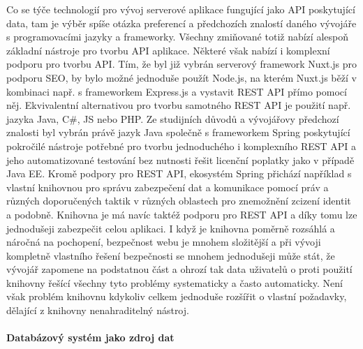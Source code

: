 \begin{itemize}
\begin{itemize}
			Co se týče technologií pro vývoj serverové aplikace fungující jako \ac{API} poskytující data, tam je výběr spíše
			otázka preferencí a předchozích znalostí daného vývojáře s programovacími jazyky a frameworky.
			Všechny zmiňované totiž nabízí alespoň základní nástroje pro tvorbu \ac{API} aplikace.
			Některé však nabízí i komplexní podporu pro tvorbu \ac{API}.
			Tím, že byl již vybrán serverový framework Nuxt.js pro podporu \Ac{SEO}, by bylo možné jednoduše použít Node.js,
			na kterém Nuxt.js běží v kombinaci např. s frameworkem Express.js a vystavit \Ac{REST} \ac{API} přímo pomocí něj.
			Ekvivalentní alternativou pro tvorbu samotného \Ac{REST} \ac{API} je použití např. jazyka Java, C\#, \ac{JS}
			nebo \Ac{PHP}.
			Ze studijních důvodů a vývojářovy předchozí znalosti byl vybrán právě jazyk Java společně s frameworkem
			Spring poskytující pokročilé nástroje potřebné pro tvorbu jednoduchého i komplexního \Ac{REST} \ac{API} a jeho
			automatizované testování bez nutnosti řešit licenční poplatky jako v případě Java EE.
			Kromě podpory pro \ac{REST} \ac{API}, ekosystém Spring přichází například s vlastní knihovnou pro správu
			zabezpečení dat a komunikace pomocí práv a různých doporučených taktik v různých oblastech pro znemožnění zcizení
			identit a podobně.
			Knihovna je má navíc taktéž podporu pro \ac{REST} \ac{API} a díky tomu lze jednodušeji zabezpečit celou aplikaci.
			I když je knihovna poměrně rozsáhlá a náročná na pochopení, bezpečnost webu je mnohem složitější a při vývoji
			kompletně vlastního řešení bezpečnosti se mnohem jednodušeji může stát, že vývojář zapomene na podstatnou část a ohrozí tak
			data uživatelů o proti použití knihovny řešící všechny tyto problémy systematicky a často automaticky.
			Není však problém knihovnu kdykoliv celkem jednoduše rozšířit o vlastní požadavky, dělající z knihovny
			nenahraditelný nástroj.


			\paragraph{Databázový systém jako zdroj dat}


\end{itemize}
\end{itemize}
